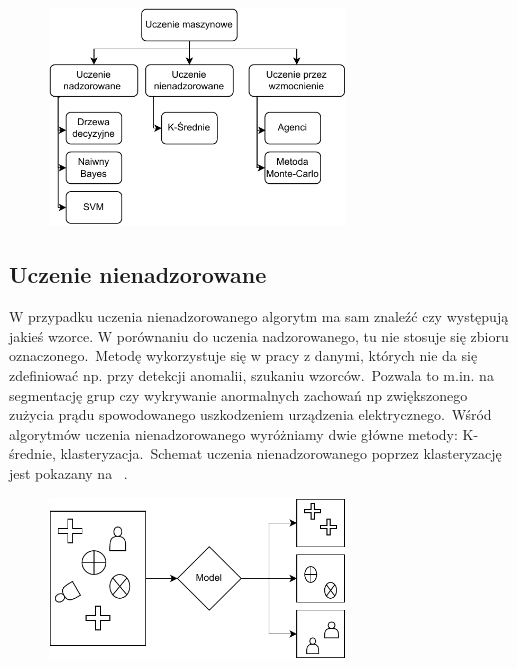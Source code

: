 \begin{figure}[H]
    \centering
    \includegraphics[width=0.7\textwidth]{images/ml-przyklady}
    \label{fig:ml-schema}
\end{figure}

\subsection{Uczenie nienadzorowane}
W przypadku uczenia nienadzorowanego algorytm ma sam znaleźć czy występują jakieś wzorce. W porównaniu do uczenia nadzorowanego, tu nie stosuje się zbioru oznaczonego.\ Metodę wykorzystuje się w pracy z danymi, których nie da się zdefiniować np. przy detekcji anomalii, szukaniu wzorców.\ Pozwala to m.in. na segmentację grup czy wykrywanie anormalnych zachowań np zwiększonego zużycia prądu spowodowanego uszkodzeniem urządzenia elektrycznego.\ Wśród algorytmów uczenia nienadzorowanego wyróżniamy dwie główne metody: K-średnie, klasteryzacja.\ Schemat uczenia nienadzorowanego poprzez klasteryzację jest pokazany na ~\cite{AiScience, Mahesh2018}.

\begin{figure}[H]
    \centering
    \includegraphics[width=0.7\textwidth]{images/unsupervised}
    \label{fig:unspervised}
\end{figure}


